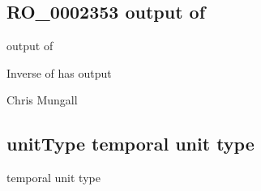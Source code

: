 \documentclass[letterpaper,10pt,english]{sphinxmanual}
\begin{document}
\subsection{RO\_0002353 \sphinxhyphen{} output of}
\label{\detokenize{doc-RO_0002353:ro-0002353-output-of}}\label{\detokenize{doc-RO_0002353:index-0}}\label{\detokenize{doc-RO_0002353::doc}}
\begin{sphinxShadowBox}

\sphinxAtStartPar
output of
\end{sphinxShadowBox}

\begin{sphinxShadowBox}

\sphinxAtStartPar
{}
\end{sphinxShadowBox}

\begin{sphinxShadowBox}

\sphinxAtStartPar
Inverse of has output
\end{sphinxShadowBox}

\begin{sphinxShadowBox}

\sphinxAtStartPar
{}
\end{sphinxShadowBox}

\begin{sphinxShadowBox}

\sphinxAtStartPar
Chris Mungall
\end{sphinxShadowBox}
\begin{quote}

\ignorespaces \end{quote}


\subsection{unitType \sphinxhyphen{} temporal unit type}
\label{\detokenize{doc-unitType:unittype-temporal-unit-type}}\label{\detokenize{doc-unitType:index-0}}\label{\detokenize{doc-unitType::doc}}
\begin{sphinxShadowBox}

\sphinxAtStartPar
temporal unit type
\end{sphinxShadowBox}
\end{document}
